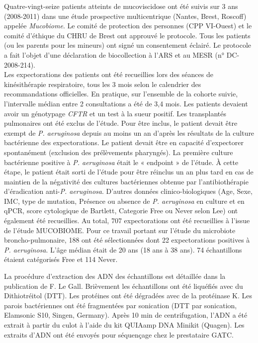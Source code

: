 \documentclass[12pt,a4paper]{article}
\begin{document}
Quatre-vingt-seize patients atteints de mucoviscidose ont été suivis sur 3 ans (2008-2011) dans une étude prospective multicentrique (Nantes, Brest, Roscoff) appelée \textit{Mucobiome}.
Le comité de protection des personnes (CPP VI-Ouest) et le comité d’éthique du CHRU de Brest ont approuvé le protocole. Tous les patients (ou les parents pour les mineurs) ont signé un consentement éclairé. Le protocole a fait l’objet d’une déclaration de biocollection à l’ARS et au MESR (n° DC-2008-214).\\
Les expectorations des patients ont été recueillies lors des séances de kinésithérapie respiratoire, tous les 3 mois selon le calendrier des recommandations officielles. En pratique, sur l’ensemble de la cohorte suivie, l’intervalle médian entre 2 consultations a été de 3,4 mois.
Les patients devaient avoir un génotypage \textit{CFTR} et un test à la sueur positif. Les transplantés pulmonaires ont été exclus de l’étude.
Pour être inclus, le patient devait être exempt de \textit{P. aeruginosa} depuis au moins un an d’après les résultats de la culture bactérienne des expectorations. Le patient devait être en capacité d’expectorer spontanément (exclusion des prélèvements pharyngés).
La première culture bactérienne positive à \textit{P. aeruginosa} était le « endpoint » de l’étude. À cette étape, le patient était sorti de l’étude pour être réinclus un an plus tard en cas de maintien de la négativité des cultures bactériennes obtenue par l’antibiothérapie d’éradication anti-\textit{P. aeruginosa}. D’autres données clinico-biologiques (Age, Sexe, IMC, type de mutation, Présence ou absence de \textit{P. aeruginosa} en culture et en qPCR, score cytologique de Bartlett, Categorie Free ou Never selon Lee\cite{Lee2003}) ont également été recueillies. Au total, 707 expectorations ont été recueillies à l’issue de l’étude MUCOBIOME. Pour ce travail portant sur l’étude du microbiote broncho-pulmonaire, 188 ont été sélectionnées dont 22 expectorations positives à \textit{P. aeruginosa}. L'âge médian était de 20 ans (18 ans à 38 ans). 74 échantillons étaient catégorisés Free et 114 Never.



La procédure d'extraction des ADN des échantillons est détaillée dans la publication de  F. Le Gall\cite{LeGall}. Brièvement les échantillons ont été liquéfiés avec du Dithiotréitol (DTT). Les protéines ont été dégradées avec de la protéinase K.
Les parois bactériennes ont été fragmentées par sonication (DTT par sonication, Elamsonic S10, Singen, Germany). Après 10 min de centrifugation, l’ADN a été extrait à partir du culot à l'aide du kit QUIAamp DNA Minikit (Quagen).
Les extraits d’ADN ont été envoyés pour séquençage chez le prestataire GATC.
\end{document}
